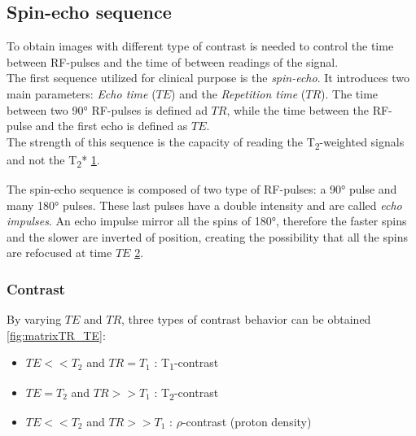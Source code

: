  \subsection{Spin-echo sequence}
 To obtain images with different type of contrast is needed to control the time between RF-pulses and the time of between readings of the signal. \\
 The first sequence utilized for clinical purpose is the \emph{spin-echo}. It introduces two main parameters: \emph{Echo time} ($TE$) and the \emph{Repetition time} ($TR$). The time between two 90° RF-pulses is defined ad $TR$, while the time between the RF-pulse and the first echo is defined as $TE$.\\
 The strength of this sequence is the capacity of reading the T\textsubscript{2}-weighted signals and not the T\textsubscript{2}* \ref{fig:T2vsT2*}.

 \begin{figure}[h]
    \centering
    \caption{}
    \label{fig:T2vsT2*}
 \end{figure}

 \noindent The spin-echo sequence is composed of two type of RF-pulses: a 90° pulse and many 180° pulses. These last pulses have a double intensity and are called \emph{echo impulses}. An echo impulse mirror all the spins of 180°, therefore the faster spins and the slower are inverted of position, creating the possibility that all the spins are refocused at time $TE$ \ref{fig:echo_seq}.

 \begin{figure}[h]
    \centering
    \caption{}
    \label{fig:echo_seq}
 \end{figure}

 \subsubsection*{Contrast}
 By varying $TE$ and $TR$, three types of contrast behavior can be obtained \ref{fig:matrixTR_TE}:
 \begin{itemize}
    \item $TE<<T_2$ and $TR=T_1$ : T\textsubscript{1}-contrast
    \item $TE=T_2$ and $TR>>T_1$ : T\textsubscript{2}-contrast
    \item $TE<<T_2$ and $TR>>T_1$ : $\rho$-contrast (proton density)
 \end{itemize}


